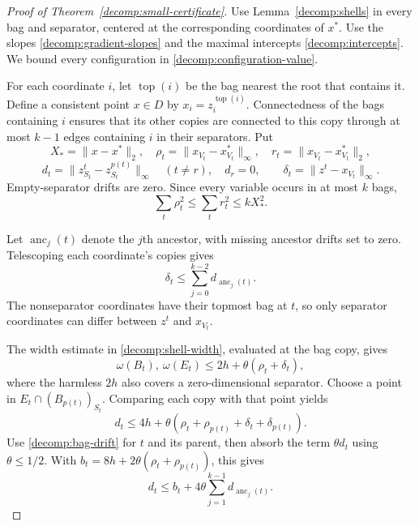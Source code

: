 \begin{proof}[Proof of Theorem~\ref{decomp:small-certificate}]
Use Lemma~\ref{decomp:shells} in every bag and separator, centered at the
corresponding coordinates of $x^*$. Use the slopes
\eqref{decomp:gradient-slopes} and the maximal intercepts
\eqref{decomp:intercepts}. We bound every configuration in
\eqref{decomp:configuration-value}.

For each coordinate $i$, let $\operatorname{top}(i)$ be the bag nearest
the root that contains it. Define a consistent point $x\in D$ by
$x_i=z^{\operatorname{top}(i)}_i$. Connectedness of the bags containing
$i$ ensures that its other copies are connected to this copy through
at most $k-1$ edges containing $i$ in their separators. Put
\[
 X_*=\|x-x^*\|_2,\quad
 \rho_t=\|x_{V_t}-x^*_{V_t}\|_\infty,\quad
 r_t=\|x_{V_t}-x^*_{V_t}\|_2,
\]
\[
 d_t=\|z^t_{S_t}-z^{p(t)}_{S_t}\|_\infty\quad(t\ne r),\quad d_r=0,
 \qquad \delta_t=\|z^t-x_{V_t}\|_\infty.
\]
Empty-separator drifts are zero. Since every variable occurs in at most
$k$ bags,
\begin{equation}\label{decomp:bag-radii}
 \sum_t\rho_t^2\le\sum_tr_t^2\le kX_*^2.
\end{equation}

Let $\operatorname{anc}_j(t)$ denote the $j$th ancestor, with missing
ancestor drifts set to zero. Telescoping each coordinate's copies gives
\begin{equation}\label{decomp:bag-drift}
 \delta_t\le\sum_{j=0}^{k-2}d_{\operatorname{anc}_j(t)}.
\end{equation}
The nonseparator coordinates have their topmost bag at $t$, so only
separator coordinates can differ between $z^t$ and $x_{V_t}$.

The width estimate in \eqref{decomp:shell-width}, evaluated at the bag
copy, gives
\[
 \omega(B_t),\ \omega(E_t)
          \le2h+\theta(\rho_t+\delta_t),
\]
where the harmless $2h$ also covers a zero-dimensional separator.
Choose a point in $E_t\cap(B_{p(t)})_{S_t}$. Comparing each copy with
that point yields
\[
 d_t\le4h+\theta(\rho_t+\rho_{p(t)}+\delta_t+\delta_{p(t)}).
\]
Use \eqref{decomp:bag-drift} for $t$ and its parent, then absorb the term
$\theta d_t$ using $\theta\le1/2$. With
$b_t=8h+2\theta(\rho_t+\rho_{p(t)})$, this gives
\begin{equation}\label{decomp:drift-recursion}
 d_t\le b_t+4\theta\sum_{j=1}^{k-1}d_{\operatorname{anc}_j(t)}.
\end{equation}


\end{proof}
